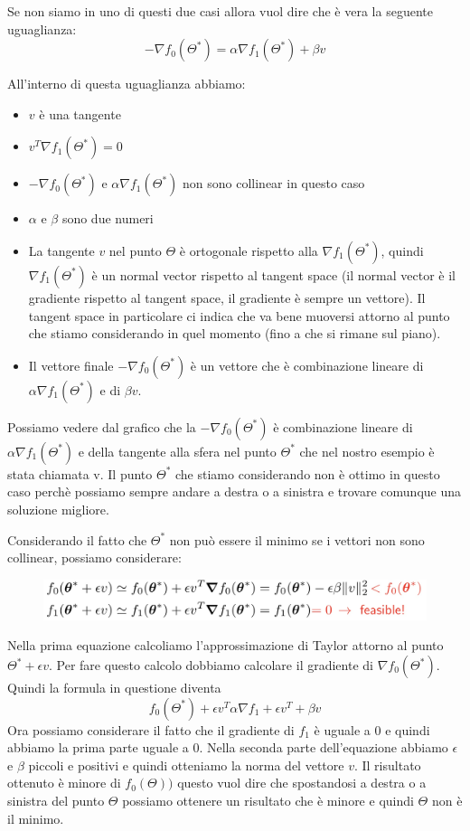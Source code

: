 \documentclass[14pt]{extreport}
\begin{document}
Se non siamo in uno di questi due casi allora vuol dire che è vera la seguente uguaglianza:
$$-\nabla f_0(\Theta^*) = \alpha \nabla f_1(\Theta^*) + \beta v$$

All'interno di questa uguaglianza abbiamo:
\begin{itemize}
	\item $v$ è una tangente
	\item $v^T\nabla f_1(\Theta^*) = 0$
	\item $-\nabla f_0(\Theta^*)$ e $\alpha \nabla f_1(\Theta^*)$ non sono collinear in questo caso
	\item $\alpha$ e $\beta$ sono due numeri
	\item La tangente $v$ nel punto $\Theta$ è ortogonale rispetto alla $\nabla f_1(\Theta^*)$, quindi $\nabla f_1(\Theta^*)$ è un normal vector
	      rispetto al tangent space (il normal vector è il gradiente rispetto al tangent space, il gradiente è sempre un vettore). Il tangent space in
	      particolare ci indica che va bene muoversi attorno al punto che stiamo considerando in quel momento (fino a che si rimane sul piano).
	\item Il vettore finale $-\nabla f_0(\Theta^*)$ è un vettore che è combinazione lineare di $\alpha \nabla f_1(\Theta^*)$ e di $\beta v$.
\end{itemize}

Possiamo vedere dal grafico che la $-\nabla f_0(\Theta^*)$ è combinazione lineare di $\alpha \nabla f_1(\Theta^*)$ e della tangente alla sfera nel
punto $\Theta^*$ che nel nostro esempio è stata chiamata v. Il punto $\Theta^*$ che stiamo considerando non è ottimo in questo caso perchè possiamo
sempre andare a destra o a sinistra e trovare comunque una soluzione migliore.

Considerando il fatto che $\Theta^*$ non può essere il minimo se i vettori non sono collinear, possiamo considerare:

\begin{figure}[H]
	\centering
	\includegraphics[width=0.7\linewidth]{291.jpeg}
\end{figure}

Nella prima equazione calcoliamo l'approssimazione di Taylor attorno al punto $\Theta^*+\epsilon v$. Per fare questo calcolo dobbiamo calcolare il
gradiente di $\nabla f_0(\Theta^*)$. Quindi la formula in questione diventa $$f_0(\Theta^*) + \epsilon v^T\alpha\nabla f_1 + \epsilon v^T + \beta v$$
Ora possiamo considerare il fatto che il gradiente di $f_1$ è uguale a 0 e quindi abbiamo la prima parte uguale a 0. Nella seconda parte
dell'equazione abbiamo $\epsilon$ e $\beta$ piccoli e positivi e quindi otteniamo la norma del vettore $v$. Il risultato ottenuto è minore di
$f_0(\Theta))$ questo vuol dire che spostandosi a destra o a sinistra del punto $\Theta$ possiamo ottenere un risultato che è minore e quindi $\Theta$
non è il minimo.
\end{document}
